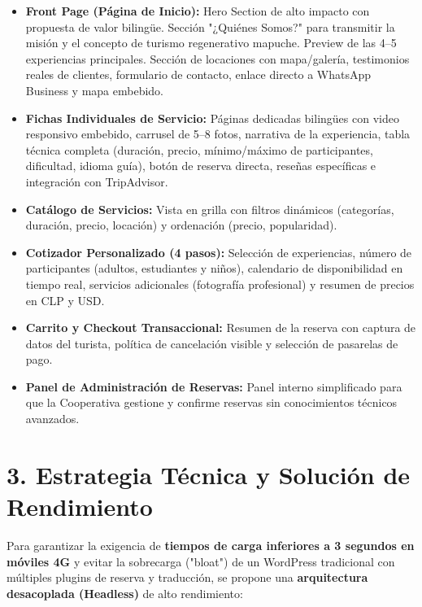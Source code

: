 \documentclass[11pt,a4paper]{article}
\begin{document}
\begin{itemize}[label=\textcolor{goldnewen}{$\bullet$}]
    \item \textbf{Front Page (Página de Inicio):} Hero Section de alto impacto con propuesta de valor bilingüe. Sección "¿Quiénes Somos?" para transmitir la misión y el concepto de turismo regenerativo mapuche. Preview de las 4--5 experiencias principales. Sección de locaciones con mapa/galería, testimonios reales de clientes, formulario de contacto, enlace directo a WhatsApp Business y mapa embebido.
    \item \textbf{Fichas Individuales de Servicio:} Páginas dedicadas bilingües con video responsivo embebido, carrusel de 5--8 fotos, narrativa de la experiencia, tabla técnica completa (duración, precio, mínimo/máximo de participantes, dificultad, idioma guía), botón de reserva directa, reseñas específicas e integración con TripAdvisor.
    \item \textbf{Catálogo de Servicios:} Vista en grilla con filtros dinámicos (categorías, duración, precio, locación) y ordenación (precio, popularidad).
    \item \textbf{Cotizador Personalizado (4 pasos):} Selección de experiencias, número de participantes (adultos, estudiantes y niños), calendario de disponibilidad en tiempo real, servicios adicionales (fotografía profesional) y resumen de precios en CLP y USD.
    \item \textbf{Carrito y Checkout Transaccional:} Resumen de la reserva con captura de datos del turista, política de cancelación visible y selección de pasarelas de pago.
    \item \textbf{Panel de Administración de Reservas:} Panel interno simplificado para que la Cooperativa gestione y confirme reservas sin conocimientos técnicos avanzados.
\end{itemize}

\section{3. Estrategia Técnica y Solución de Rendimiento}
Para garantizar la exigencia de \textbf{tiempos de carga inferiores a 3 segundos en móviles 4G} y evitar la sobrecarga ("bloat") de un WordPress tradicional con múltiples plugins de reserva y traducción, se propone una \textbf{arquitectura desacoplada (Headless)} de alto rendimiento:
\end{document}
